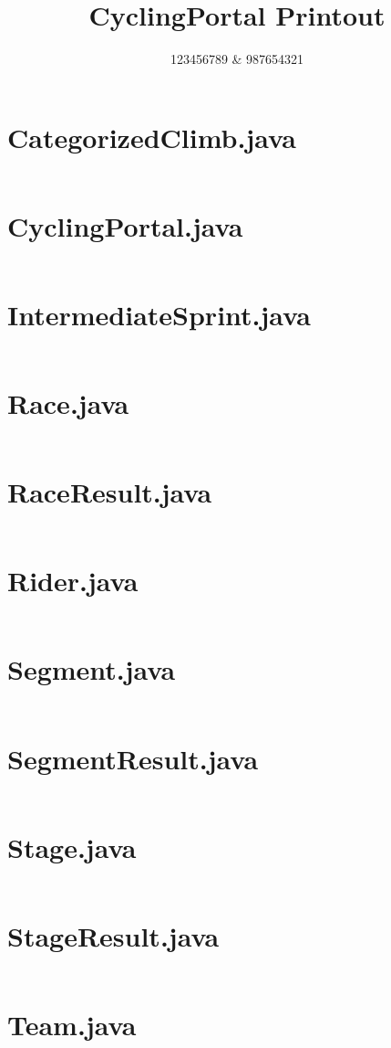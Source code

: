 \documentclass[a4paper, 12pt]{article}
\newcommand{\includesrc}[1]{
    \section{#1}
    \inputminted[linenos,fontsize=\footnotesize, breaklines, obeytabs=true,tabsize=2]{java}{./CyclingPortal/src/cycling/#1}
}
\begin{document}
    \title{\textrm{CyclingPortal Printout}}
    \author{\textrm{123456789 \& 987654321}}
    \date{}
    \maketitle
    \tableofcontents
    \newpage
    \includesrc{CategorizedClimb.java}
    \includesrc{CyclingPortal.java}
    \includesrc{IntermediateSprint.java}
    \includesrc{Race.java}
    \includesrc{RaceResult.java}
    \includesrc{Rider.java}
    \includesrc{Segment.java}
    \includesrc{SegmentResult.java}
    \includesrc{Stage.java}
    \includesrc{StageResult.java}
    \includesrc{Team.java}
\end{document}
